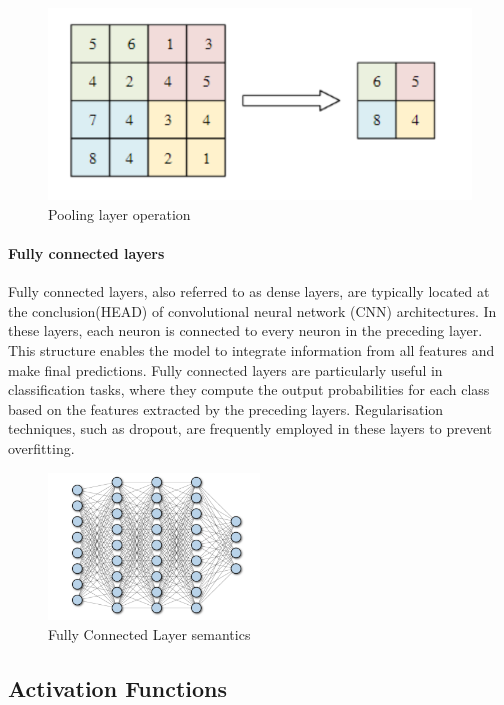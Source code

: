\begin{figure}[h]
\centering
\includegraphics[width=.50\textwidth]{figures/pooling}
\caption{Pooling layer operation~\cite{article}}
\label{fig:pooling}
\end{figure}

\paragraph{Fully connected layers}\label{par:fully-connected-layers}

Fully connected layers, also referred to as dense layers, are typically located at
the conclusion(HEAD) of convolutional neural network (CNN) architectures.
In these layers, each neuron is connected to every neuron in the preceding layer.
This structure enables the model to integrate information from all features and make final predictions.
Fully connected layers are particularly useful in classification tasks,
where they compute the output probabilities for each class based on the features extracted by the preceding layers.
Regularisation techniques, such as dropout, are frequently employed in these layers to prevent overfitting.
\begin{figure}[ht]
\centering
\includegraphics[width=0.50\textwidth]{figures/fully connected}
\caption{Fully Connected Layer semantics~\cite{article}}
\label{fig:fullconn}
\end{figure}

\subsection{Activation Functions}\label{subsec:activation-functions}


